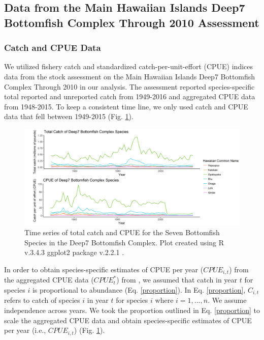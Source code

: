 \documentclass[oneside,12pt,final]{sty/ucthesis-CA2012}
\let\cite\citep                             %
\begin{document}
\begin{mainmatter}
\subsection{Data from the Main Hawaiian Islands Deep7 Bottomfish Complex Through 2010 Assessment}
\subsubsection{Catch and CPUE Data}
We utilized fishery catch and standardized catch-per-unit-effort (CPUE) indices data from the stock assessment on the Main Hawaiian Islands Deep7 Bottomfish Complex Through 2010 \cite{langseth2018stock} in our analysis. The assessment reported species-specific total reported and unreported catch from 1949-2016 and aggregated CPUE data from 1948-2015. To keep a consistent time line, we only used catch and CPUE data that fell between 1949-2015 (Fig. \ref{catchandcpue}).

\begin{figure}[H]
     \centering
       \includegraphics[width=\textwidth]{fig/catch_cpue}
    \caption{Time series of total catch and CPUE for the Seven Bottomfish Species in the Deep7 Bottomfish Complex. Plot created using R v.3.4.3 \cite{Rcite} ggplot2 package v.2.2.1 \cite{ggplot}. }
    \label{catchandcpue}
\end{figure}

In order to obtain species-specific estimates of CPUE per year ($CPUE_{i,t}$) from the aggregated CPUE data ($CPUE_t^*$) from \cite{langseth2018stock}, we assumed that catch in year $t$ for species $i$ is proportional to abundance (Eq. \ref{proportion}). In Eq. \ref{proportion}, $C_{i,t}$ refers to catch of species $i$ in year $t$ for species $i$ where $i=1,\dots,n$. We assume independence across years. We took the proportion outlined in Eq. \ref{proportion} to scale the aggregated CPUE data and obtain species-specific estimates of CPUE per year (i.e., $CPUE_{i,t}$) (Fig. \ref{catchandcpue}).


\end{mainmatter}
\end{document}
